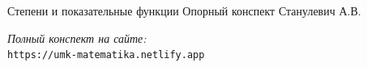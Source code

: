 \documentclass{umk-matematika}
\begin{document}
\maketitlepage
    {Степени и показательные функции}
    {Опорный конспект}
    {Станулевич А.В.}

\begin{center}
\vspace{1.5cm}
\textit{Полный конспект на сайте:}\\
\texttt{https://umk-matematika.netlify.app}
\end{center}
\end{document}
